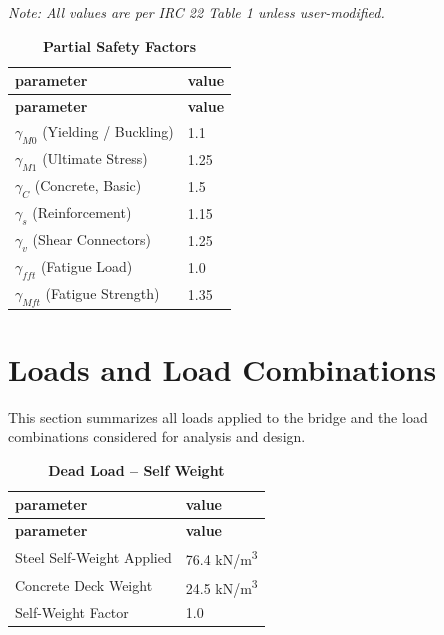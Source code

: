 \documentclass[12pt,a4paper]{report}
\numberwithin{table}{chapter}
\numberwithin{figure}{chapter}
\newcommand{\ReportTableRowGap}{6pt}
\begin{document}
\label{subsec:safety-factors}

\vspace{2.2em}

\vspace{0.3em}
\noindent\textit{Note: All values are per IRC 22 Table 1 unless user-modified.}

\vspace{0.4em}
\begin{longtable}{|L{5.5cm}|p{10.0cm}|}
\caption{\textbf{Partial Safety Factors}}\\
\hline
\textbf{parameter} & \textbf{value} \\
\hline
\endfirsthead
\hline
\textbf{parameter} & \textbf{value} \\
\hline
\endhead

\textnormal{$\gamma_{M0}$ (Yielding / Buckling)} & 1.1 \\[\ReportTableRowGap]
\hline
\textnormal{$\gamma_{M1}$ (Ultimate Stress)} & 1.25 \\[\ReportTableRowGap]
\hline
\textnormal{$\gamma_C$ (Concrete, Basic)} & 1.5 \\[\ReportTableRowGap]
\hline
\textnormal{$\gamma_s$ (Reinforcement)} & 1.15 \\[\ReportTableRowGap]
\hline
\textnormal{$\gamma_v$ (Shear Connectors)} & 1.25 \\[\ReportTableRowGap]
\hline
\textnormal{$\gamma_{fft}$ (Fatigue Load)} & 1.0 \\[\ReportTableRowGap]
\hline
\textnormal{$\gamma_{Mft}$ (Fatigue Strength)} & 1.35 \\[\ReportTableRowGap]
\hline
\end{longtable}


\chapter{Loads and Load Combinations}

This section summarizes all loads applied to the bridge and the load combinations considered for analysis and design.

\vspace{1em}
\begin{longtable}{|L{5.5cm}|p{10.0cm}|}
\caption{\textbf{Dead Load -- Self Weight}}\\
\hline
\textbf{parameter} & \textbf{value} \\
\hline
\endfirsthead
\hline
\textbf{parameter} & \textbf{value} \\
\hline
\endhead

\textnormal{Steel Self-Weight Applied} & 76.4 kN/m\textsuperscript{3} \\[\ReportTableRowGap]
\hline
\textnormal{Concrete Deck Weight} & 24.5 kN/m\textsuperscript{3} \\[\ReportTableRowGap]
\hline
\textnormal{Self-Weight Factor} & 1.0 \\[\ReportTableRowGap]
\hline
\end{longtable}
\end{document}
